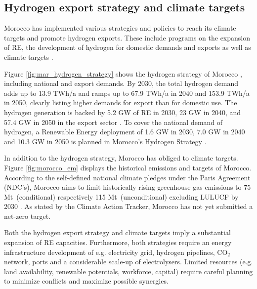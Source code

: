 \subsection*{Hydrogen export strategy and climate targets}

Morocco has implemented various strategies and policies to reach its climate targets and promote hydrogen exports. These include programs on the expansion of RE, the development of hydrogen for domestic demands and exports as well as climate targets \cite{MarHyStrat2021, CAT2021}.

Figure \ref{fig:mar_hydrogen_strategy} shows the hydrogen strategy of Morocco \cite{MarHyStrat2021}, including national and export demands.
By 2030, the total hydrogen demand adds up to 13.9 TWh/a and ramps up to 67.9 TWh/a in 2040 and 153.9 TWh/a in 2050, 
clearly listing higher demands for export than for domestic use. The hydrogen generation is backed by 5.2 GW of RE in 2030, 23 GW in 2040, and 57.4 GW in 2050 in the export sector \cite{MarHyStrat2021}. To cover the national demand of hydrogen, a Renewable Energy deployment of 1.6 GW in 2030, 7.0 GW in 2040 and 10.3 GW in 2050 is planned in Morocco's Hydrogen Strategy \cite{MarHyStrat2021}.


In addition to the hydrogen strategy, Morocco has obliged to climate targets. Figure \ref{fig:morocco_em} displays the historical emissions and targets of Morocco.
According to the self-defined national climate pledges under the Paris Agreement (NDC's), Morocco aims to limit historically rising greenhouse gas emissions to 75 Mt\coe\ (conditional) respectively 115 Mt\coe\ (unconditional) excluding LULUCF by 2030 \cite{CAT2021}. 
As stated by the Climate Action Tracker\cite{CAT2021}, Morocco has not yet submitted a net-zero target. 


Both the hydrogen export strategy and climate targets imply a substantial expansion of RE capacities. Furthermore, both strategies require an energy infrastructure development of e.g. electricity grid, hydrogen pipelines, $\mathrm{CO_2}$ network, ports and a considerable scale-up of electrolysers.
Limited resources (e.g. land availability, renewable potentials, workforce, capital) require careful planning to minimize conflicts and maximize possible synergies.


